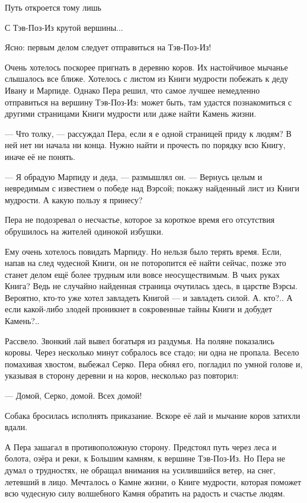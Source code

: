 \documentclass[oneside,final,14pt]{extreport}
\begin{document}
	
	
	
\qquad \qquad \qquad \qquad 	Путь откроется тому лишь
	
\qquad \qquad \qquad \qquad 	С Тэв-Поз-Из крутой вершины...
	
	
	
	
	Ясно: первым делом следует отправиться на Тэв-Поз-Из!
	
	Очень хотелось поскорее пригнать в деревню коров. Их настойчивое мычанье слышалось все ближе. Хотелось с листом из Книги мудрости побежать к деду Ивану и Марпиде. Однако Пера решил, что самое лучшее немедленно отправиться на вершину Тэв-Поз-Из: может быть, там удастся познакомиться с другими страницами Книги мудрости или даже найти Камень жизни.
	
	— Что толку, — рассуждал Пера, если я е одной страницей приду к людям? В ней нет ни начала ни конца. Нужно найти и прочесть по порядку всю Книгу, иначе её не понять.
	
	— Я обрадую Марпиду и деда, — размышлял он. — Вернусь целым и невредимым с известием о победе над Вэрсой; покажу найденный лист из Книги мудрости. А какую пользу я принесу?
	
	Пера не подозревал о несчастье, которое за короткое время его отсутствия обрушилось на жителей одинокой избушки.
	
	Ему очень хотелось повидать Марпиду. Но нельзя было терять время. Если, напав на след чудесной Книги, он не поторопится её найти сейчас, позже это станет делом ещё более трудным или вовсе неосуществимым. В чьих руках Книга? Ведь не случайно найденная страница очутилась здесь, в царстве Вэрсы. Вероятно, кто-то уже хотел завладеть Книгой — и завладеть силой. А. кто?.. А если какой-либо злодей проникнет в сокровенные тайны Книги и добудет Камень?..
	
	Рассвело. Звонкий лай вывел богатыря из раздумья. На поляне показались коровы. Через несколько минут собралось все стадо; ни одна не пропала. Весело помахивая хвостом, выбежал Серко. Пера обнял его, погладил по умной голове и, указывая в сторону деревни и на коров, несколько раз повторил:
	
	— Домой, Серко, домой. Всех домой!
	
	Собака бросилась исполнять приказание. Вскоре её лай и мычание коров затихли вдали.
	
	А Пера зашагал в противоположную сторону. Предстоял путь через леса и болота, озёра и реки, к Большим камням, к вершине Тэв-Поз-Из. Но Пера не думал о трудностях, не обращал внимания на усилившийся ветер, на снег, летевший в лицо. Мечталось о Камне жизни, о Книге мудрости, которая поможет всю чудесную силу волшебного Камня обратить на радость и счастье людям.
	
\end{document}
